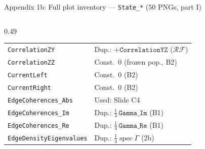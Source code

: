 \documentclass[aspectratio=169,11pt]{beamer}
\newcommand{\spec}{\operatorname{spec}}
\begin{document}
\begin{frame}{Appendix 1b: Full plot inventory --- \texttt{State\_*} ($50$ PNGs, part I)}
\begin{columns}[T,totalwidth=\textwidth]
\begin{column}{0.49\textwidth}
\begin{tabular}{@{}ll@{}}
\texttt{CorrelationZY} & Dup.: $+\texttt{CorrelationYZ}$ ($\mathcal R\mathcal F$) \\
\texttt{CorrelationZZ} & Const.\ $0$ (frozen pop., B2) \\
\texttt{CurrentLeft} & Const.\ $0$ (B2) \\
\texttt{CurrentRight} & Const.\ $0$ (B2) \\
\texttt{EdgeCoherences\_Abs} & Used: Slide C4 \\
\texttt{EdgeCoherences\_Im} & Dup.: $\frac14\,\texttt{Gamma\_Im}$ (B1) \\
\texttt{EdgeCoherences\_Re} & Dup.: $\frac14\,\texttt{Gamma\_Re}$ (B1) \\
\texttt{EdgeDensityEigenvalues} & Dup.: $\frac14\spec\Gamma$ (2b) \\\bottomrule
\end{tabular}
\end{column}
\end{columns}
\end{frame}
\end{document}
